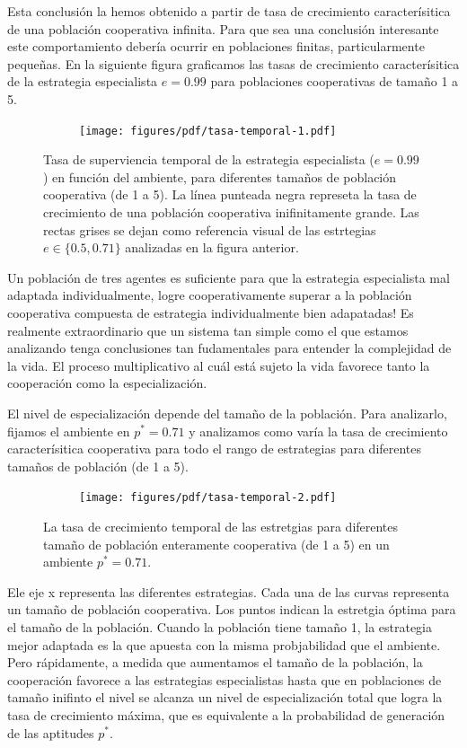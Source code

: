 \documentclass[a4paper,10pt]{article}
\begin{document}
{Esta conclusión la hemos obtenido a partir de tasa de crecimiento caracterísitica de una población cooperativa infinita.
Para que sea una conclusión interesante este comportamiento debería ocurrir en poblaciones finitas, particularmente pequeñas.
En la siguiente figura graficamos las tasas de crecimiento caracterísitica de la estrategia especialista $e=0.99$ para poblaciones cooperativas de tamaño 1 a 5.
%
\begin{figure}[H]
    \centering
    \begin{subfigure}[b]{0.66\textwidth}
    \texttt{[image: figures/pdf/tasa-temporal-1.pdf]}
    \end{subfigure}
    \caption{
    Tasa de superviencia temporal de la estrategia especialista ($e=0.99$) en función del ambiente, para diferentes tamaños de población cooperativa (de 1 a 5).
    La línea punteada negra represeta la tasa de crecimiento de una población cooperativa inifinitamente grande.
    Las rectas grises se dejan como referencia visual de las estrtegias $e \in \{0.5, 0.71\}$ analizadas en la figura anterior.
    }
    \label{fig:multilevel-selection-1}
\end{figure}
%
Un población de tres agentes es suficiente para que la estrategia especialista mal adaptada individualmente, logre cooperativamente superar a la población cooperativa compuesta de estrategia individualmente bien adapatadas!
Es realmente extraordinario que un sistema tan simple como el que estamos analizando tenga conclusiones tan fudamentales para entender la complejidad de la vida.
El proceso multiplicativo al cuál está sujeto la vida favorece tanto la cooperación como la especialización.


El nivel de especialización depende del tamaño de la población.
Para analizarlo, fijamos el ambiente en $p^* = 0.71$ y analizamos como varía la tasa de crecimiento caracterísitica cooperativa para todo el rango de estrategias para diferentes tamaños de población (de 1 a 5).
%
\begin{figure}[H]
    \centering
    \begin{subfigure}[b]{0.66\textwidth}
    \texttt{[image: figures/pdf/tasa-temporal-2.pdf]}
    \end{subfigure}
    \caption{
    La tasa de crecimiento temporal de las estretgias para diferentes tamaño de población enteramente cooperativa (de 1 a 5) en un ambiente $p^*=0.71$.
    }
    \label{fig:multilevel-selection-1}
\end{figure}
%
Ele eje x representa las diferentes estrategias.
Cada una de las curvas representa un tamaño de población cooperativa.
Los puntos indican la estretgia óptima para el tamaño de la población.
Cuando la población tiene tamaño 1, la estrategia mejor adaptada es la que apuesta con la misma probjabilidad que el ambiente.
Pero rápidamente, a medida que aumentamos el tamaño de la población, la cooperación favorece a las estrategias especialistas hasta que en poblaciones de tamaño inifinto el nivel se alcanza un nivel de especialización total que logra la tasa de crecimiento máxima, que es equivalente a la probabilidad de generación de las aptitudes $p^*$.

}
\end{document}
